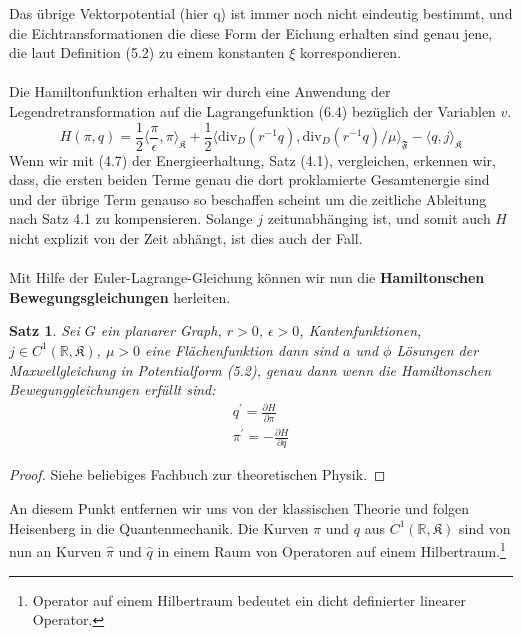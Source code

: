 \documentclass[11pt,a4paper,leqno]{report}
\newtheorem{proposition}{Satz}[chapter]
\numberwithin{equation}{chapter}
\begin{document}
\noindent
Das \"ubrige Vektorpotential (hier q) ist immer noch nicht eindeutig bestimmt, und die Eichtransformationen die diese Form der Eichung erhalten sind genau jene, die laut Definition (5.2) zu einem konstanten $\xi$ korrespondieren.\\
\\
Die Hamiltonfunktion erhalten wir durch eine Anwendung der Legendretransformation auf die Lagrangefunktion (6.4) bez\"uglich der Variablen $v$.
\begin{equation}
	H(\pi, q) = \frac{1}{2}\langle \frac{\pi}{\epsilon}, \pi\rangle_{\mathfrak{K}} + \frac{1}{2}\langle \text{div}_D(r^{-1}q), \text{div}_D(r^{-1}q)/\mu\rangle_{\mathfrak{F}} - \langle q, j\rangle_{\mathfrak{K}}
\end{equation}
Wenn wir mit (4.7) der Energieerhaltung, Satz (4.1), vergleichen, erkennen wir, dass, die ersten beiden Terme genau die dort proklamierte Gesamtenergie sind und der \"ubrige Term genauso so beschaffen scheint um die zeitliche Ableitung nach Satz 4.1 zu kompensieren. Solange $j$ zeitunabh\"anging ist, und somit auch $H$ nicht explizit von der Zeit abh\"angt, ist dies auch der Fall.\\
\\
Mit Hilfe der Euler-Lagrange-Gleichung k\"onnen wir nun die \textbf{Hamiltonschen Bewegungsgleichungen} herleiten.
\begin{proposition}
Sei $G$ ein planarer Graph, $r>0$, $\epsilon>0$,  Kantenfunktionen, $j\in C^1(\mathbb{R}, \mathfrak{K})$, $\mu>0$ eine Fl\"achenfunktion dann sind $a$ und $\phi$ L\"osungen der Maxwellgleichung in Potentialform (5.2), genau dann wenn die Hamiltonschen Bewegunggleichungen erf\"ullt sind:
\begin{align}
	q^\prime = \frac{\partial H}{\partial \pi}\\
	\pi^\prime = - \frac{\partial H}{\partial q}
\end{align}
\end{proposition}
\begin{proof}
	Siehe beliebiges Fachbuch zur theoretischen Physik.
\end{proof}
\noindent
An diesem Punkt entfernen wir uns von der klassischen Theorie und folgen Heisenberg in die Quantenmechanik. Die Kurven $\pi$ und $q$ aus $C^1(\mathbb{R}, \mathfrak{K})$ sind von nun an Kurven $\hat{\pi}$ und $\hat{q}$ in einem Raum von Operatoren auf einem Hilbertraum.\footnote{Operator auf einem Hilbertraum bedeutet ein dicht definierter linearer Operator.}
\end{document}
